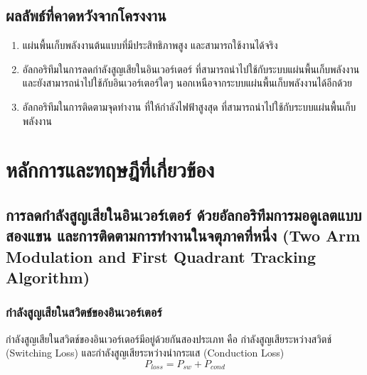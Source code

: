 \documentclass[11pt,a4paper]{article}
\begin{document}

\subsection{ผลลัพธ์ที่คาดหวังจากโครงงาน}


\begin{enumerate}
    \item แผ่นพื้นเก็บพลังงานต้นแบบที่มีประสิทธิภาพสูง และสามารถใช้งานได้จริง
    \item อัลกอริทึมในการลดกำลังสูญเสียในอินเวอร์เตอร์ ที่สามารถนำไปใช้กับระบบแผ่นพื้นเก็บพลังงาน และยังสามารถนำไปใช้กับอินเวอร์เตอร์ใดๆ นอกเหนือจากระบบแผ่นพื้นเก็บพลังงานได้อีกด้วย
    \item อัลกอริทึมในการติดตามจุดทำงาน ที่ให้กำลังไฟฟ้าสูงสุด ที่สามารถนำไปใช้กับระบบแผ่นพื้นเก็บพลังงาน
\end{enumerate}






\section{หลักการและทฤษฎีที่เกี่ยวข้อง}
\subsection{การลดกำลังสูญเสียในอินเวอร์เตอร์ ด้วยอัลกอริทึมการมอดูเลตแบบสองแขน และการติดตามการทำงานในจตุภาคที่หนึ่ง (Two Arm Modulation and First Quadrant Tracking Algorithm)}
\subsubsection{กำลังสูญเสียในสวิตช์ของอินเวอร์เตอร์}
กำลังสูญเสียในสวิตช์ของอินเวอร์เตอร์มีอยู่ด้วยกันสองประเภท คือ กำลังสูญเสียระหว่างสวิตช์ (Switching Loss) และกำลังสูญเสียระหว่างนำกระแส (Conduction Loss)
\begin{equation*}
    P_{loss} = P_{sw} + P_{cond}
\end{equation*}
\end{document}

